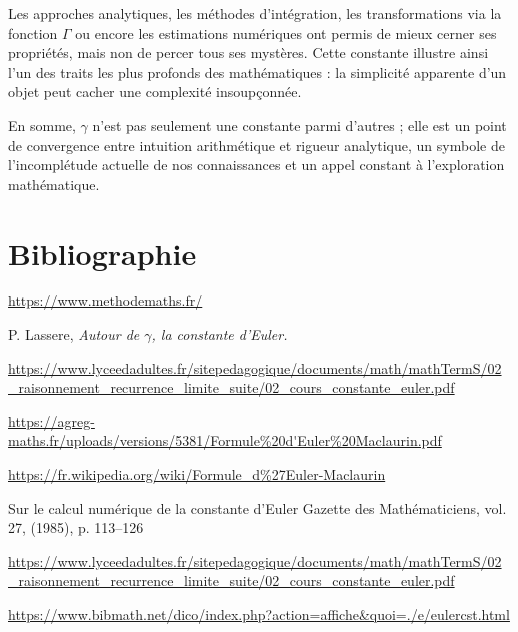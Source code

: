 \documentclass[a4paper,12pt]{article}
\begin{document}
Les approches analytiques, les méthodes d’intégration, les transformations via la fonction \(\Gamma\) ou encore les estimations numériques ont permis de mieux cerner ses propriétés, mais non de percer tous ses mystères. Cette constante illustre ainsi l’un des traits les plus profonds des mathématiques : la simplicité apparente d’un objet peut cacher une complexité insoupçonnée.

En somme, \(\gamma\) n’est pas seulement une constante parmi d’autres ; elle est un point de convergence entre intuition arithmétique et rigueur analytique, un symbole de l’incomplétude actuelle de nos connaissances et un appel constant à l’exploration mathématique.


\section*{Bibliographie}

\begin{enumerate}[label={[{\bfseries \arabic*}]}]

\item \url{https://www.methodemaths.fr/}

\item P. Lassere, \textit{Autour de $\gamma$, la constante d’Euler.}

\item \url{https://www.lyceedadultes.fr/sitepedagogique/documents/math/mathTermS/02_raisonnement_recurrence_limite_suite/02_cours_constante_euler.pdf}

\item \url{https://agreg-maths.fr/uploads/versions/5381/Formule%20d'Euler%20Maclaurin.pdf}

\item \url{https://fr.wikipedia.org/wiki/Formule_d%27Euler-Maclaurin}

\item Sur le calcul numérique de la constante d’Euler
Gazette des Mathématiciens, vol. 27, (1985), p. 113–126 

\item \url{https://www.lyceedadultes.fr/sitepedagogique/documents/math/mathTermS/02_raisonnement_recurrence_limite_suite/02_cours_constante_euler.pdf}

\item \url{https://www.bibmath.net/dico/index.php?action=affiche&quoi=./e/eulercst.html}

\end{enumerate}
\end{document}
